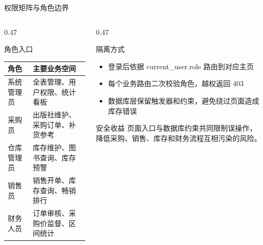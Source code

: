 \documentclass{beamer}
\newcommand{\smallitems}{\setlength{\itemsep}{0.18em}\footnotesize}
\newcommand{\code}[1]{{\ttfamily\small #1}}
\begin{document}
\begin{frame}{权限矩阵与角色边界}
  \begin{columns}[T]
    \begin{column}{0.47\textwidth}
      \begin{block}{角色入口}
        \scriptsize
        \begin{tabularx}{\linewidth}{lX}
          \toprule
          角色 & 主要业务空间 \\
          \midrule
          系统管理员 & 全表管理、用户权限、统计看板 \\
          采购员 & 出版社维护、采购订单、补货参考 \\
          仓库管理员 & 库存维护、图书查询、库存预警 \\
          销售员 & 销售开单、库存查询、畅销排行 \\
          财务人员 & 订单审核、采购价监督、区间统计 \\
          \bottomrule
        \end{tabularx}
      \end{block}
    \end{column}
    \begin{column}{0.47\textwidth}
      \begin{block}{隔离方式}
        \smallitems
        \begin{itemize}
          \item 登录后依据 \code{current\_user.role} 路由到对应主页
          \item 每个业务路由二次校验角色，越权返回 403
          \item 数据库层保留触发器和约束，避免绕过页面造成库存错误
        \end{itemize}
      \end{block}
      \begin{block}{安全收益}
        \small
        页面入口与数据库约束共同限制误操作，降低采购、销售、库存和财务流程互相污染的风险。
      \end{block}
    \end{column}
  \end{columns}
\end{frame}
\end{document}
